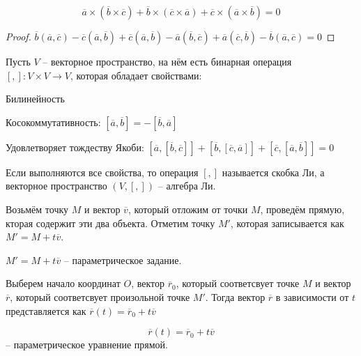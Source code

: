 	\begin{Thm}
		$$\overline{a} \times (\overline{b} \times \overline{c}) + \overline{b}\times(\overline{c} \times \overline{a}) + \overline{c} \times (\overline{a}\times \overline{b}) = 0$$
	\end{Thm}

	\begin{proof}
		$\overline{b}(\overline{a},\overline{c}) - \overline{c}(\overline{a}, \overline{b}) + \overline{c}(\overline{a}, \overline{b}) - \overline{a}(\overline{b}, \overline{c}) + \overline{a}(\overline{c}, \overline{b}) - \overline{b}(\overline{a}, \overline{c}) = 0$
	\end{proof}

	Пусть $V$ -- векторное пространство, на нём есть бинарная операция $[,]: V \times V \to V$, которая обладает свойствами:
	\begin{MyList}
		\item Билинейность
		\item Косокоммутативность: $[\overline{a}, \overline{b}] = -[\overline{b}, \overline{a}]$
		\item Удовлетворяет тождеству Якоби: $[\overline{a}, [\overline{b}, \overline{c}]] + [\overline{b}, [\overline{c}, \overline{a}]] + [\overline{c}, [\overline{a}, \overline{b}]] = 0$
	\end{MyList}
	
	\begin{Def}
		Если выполняются все свойства, то операция $[,]$ называется скобка Ли, а векторное пространство $(V, [,])$ -- алгебра Ли.
	\end{Def}


	Возьмём точку $M$ и вектор $\overline{v}$, который отложим от точки $M$, проведём прямую, кторая содержит эти два объекта. Отметим точку $M'$, которая записывается как $M' = M + t \overline{v}$.  

	\begin{Def}
		$M' = M + t \overline{v}$ -- параметрическое задание. 
	\end{Def}

	Выберем начало координат $O$, вектор $\overline{r}_0$, который соответсвует точке $M$ и вектор $\overline{r}$, который соответсвует произольной точке $M'$. Тогда вектор $\overline{r}$ в зависимости от $t$ представляется как $\overline{r}(t) = \overline{r}_0 + t \overline{v}$
	
	\begin{Def}
		$$\overline{r}(t) = \overline{r}_0 + t \overline{v}$$ -- параметрическое уравнение прямой.
	\end{Def}


